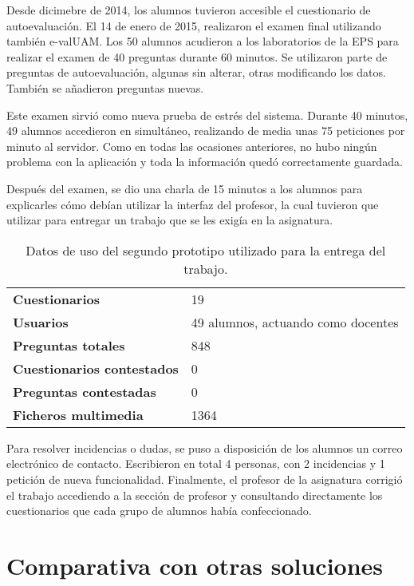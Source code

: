 Desde dicimebre de 2014, los alumnos tuvieron accesible el cuestionario de autoevaluación. El 14 de enero de 2015, realizaron el examen final utilizando también \acrshort{e-valUAM}. Los 50 alumnos acudieron a los laboratorios de la EPS para realizar el examen de 40 preguntas durante 60 minutos. Se utilizaron parte de preguntas de autoevaluación, algunas sin alterar, otras modificando los datos. También se añadieron preguntas nuevas.

Este examen sirvió como nueva prueba de estrés del sistema. Durante 40 minutos, 49 alumnos accedieron en simultáneo, realizando de media unas 75 peticiones por minuto al servidor. Como en todas las ocasiones anteriores, no hubo ningún problema con la aplicación y toda la información quedó correctamente guardada.

Después del examen, se dio una charla de 15 minutos a los alumnos para explicarles cómo debían utilizar la interfaz del profesor, la cual tuvieron que utilizar para entregar un trabajo que se les exigía en la asignatura.

\begin{table}[hc]
	\centering
	\begin{tabular}{l|l}
		{\bf Cuestionarios}             & 19 \\ 
		{\bf Usuarios}                  & 49 alumnos, actuando como docentes\\
		{\bf Preguntas totales}         & 848  \\ 
		{\bf Cuestionarios contestados} & 0                              \\ 
		{\bf Preguntas contestadas}     & 0                             \\ 
		{\bf Ficheros multimedia}		& 1364							   \\
	\end{tabular}
	\caption{Datos de uso del segundo prototipo utilizado para la entrega del trabajo.}
\end{table}

Para resolver incidencias o dudas, se puso a disposición de los alumnos un correo electrónico de contacto. Escribieron en total 4 personas, con 2 incidencias y 1 petición de nueva funcionalidad. Finalmente, el profesor de la asignatura corrigió el trabajo accediendo a la sección de profesor y consultando directamente los cuestionarios que cada grupo de alumnos había confeccionado.



\section{Comparativa con otras soluciones}